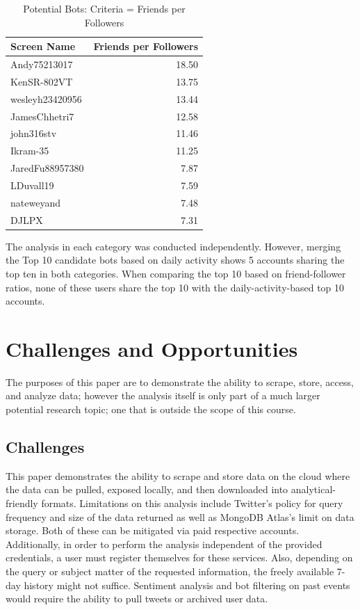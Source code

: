 \begin{table}[htb]
\centering
\caption{Potential Bots: Criteria = Friends per Followers}
\label{t:ratio-top10}
\begin{tabular}{lr}
Screen Name & Friends per Followers \\
\toprule
Andy75213017    & 18.50 \\
KenSR-802VT     & 13.75 \\
wesleyh23420956 & 13.44 \\
JamesChhetri7   & 12.58 \\
john316stv      & 11.46 \\
Ikram-35        & 11.25 \\
JaredFu88957380 & 7.87 \\
LDuvall19       & 7.59 \\
nateweyand      & 7.48 \\
DJLPX           & 7.31  
\end{tabular}
\end{table}

The analysis in each category was conducted independently. However, merging the
Top 10 candidate bots based on daily activity shows 5 accounts sharing the top
ten in both categories. When comparing the top 10 based on friend-follower
ratios, none of these users share the top 10 with the daily-activity-based top
10 accounts.

\section{Challenges and Opportunities}

The purposes of this paper are to demonstrate the ability to scrape, store,
access, and analyze data; however the analysis itself is only part of a much
larger potential research topic; one that is outside the scope of this course. 

\subsection{Challenges}

This paper demonstrates the ability to scrape and store data on the cloud where
the data can be pulled, exposed locally, and then downloaded into
analytical-friendly formats. Limitations on this analysis include Twitter's
policy for query frequency and size of the data returned as well as MongoDB
Atlas's limit on data storage. Both of these can be mitigated via paid
respective accounts. Additionally, in order to perform the analysis independent
of the provided credentials, a user must register themselves for these
services.  Also, depending on the query or subject matter of the requested
information, the freely available 7-day history might not suffice. Sentiment
analysis and bot filtering on past events would require the ability to pull
tweets or archived user data. 

